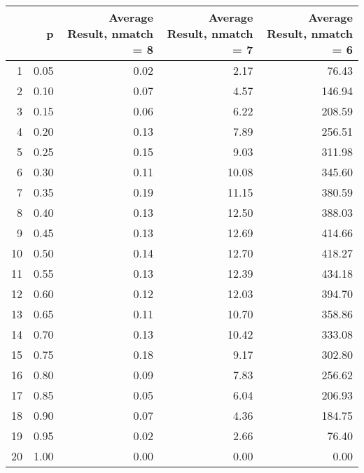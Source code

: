 \begin{table}[ht]
\centering
\begin{tabular}{rrrrr}
  \hline
 & p & Average Result, nmatch = 8 & Average Result, nmatch = 7 & Average Result, nmatch = 6 \\ 
  \hline
1 & 0.05 & 0.02 & 2.17 & 76.43 \\ 
  2 & 0.10 & 0.07 & 4.57 & 146.94 \\ 
  3 & 0.15 & 0.06 & 6.22 & 208.59 \\ 
  4 & 0.20 & 0.13 & 7.89 & 256.51 \\ 
  5 & 0.25 & 0.15 & 9.03 & 311.98 \\ 
  6 & 0.30 & 0.11 & 10.08 & 345.60 \\ 
  7 & 0.35 & 0.19 & 11.15 & 380.59 \\ 
  8 & 0.40 & 0.13 & 12.50 & 388.03 \\ 
  9 & 0.45 & 0.13 & 12.69 & 414.66 \\ 
  10 & 0.50 & 0.14 & 12.70 & 418.27 \\ 
  11 & 0.55 & 0.13 & 12.39 & 434.18 \\ 
  12 & 0.60 & 0.12 & 12.03 & 394.70 \\ 
  13 & 0.65 & 0.11 & 10.70 & 358.86 \\ 
  14 & 0.70 & 0.13 & 10.42 & 333.08 \\ 
  15 & 0.75 & 0.18 & 9.17 & 302.80 \\ 
  16 & 0.80 & 0.09 & 7.83 & 256.62 \\ 
  17 & 0.85 & 0.05 & 6.04 & 206.93 \\ 
  18 & 0.90 & 0.07 & 4.36 & 184.75 \\ 
  19 & 0.95 & 0.02 & 2.66 & 76.40 \\ 
  20 & 1.00 & 0.00 & 0.00 & 0.00 \\ 
   \hline
\end{tabular}
\end{table}
